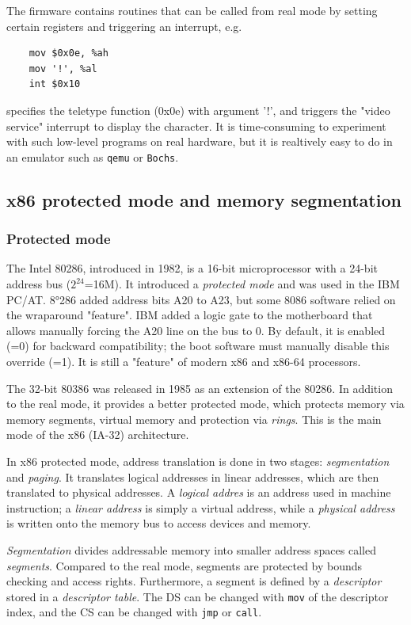 \documentclass[toc]{../cs-classes/cs-classes}
\begin{document}
The firmware contains routines that can be called from real mode by setting certain registers and triggering an interrupt, e.g.
\begin{verbatim}
    mov $0x0e, %ah
    mov '!', %al
    int $0x10
\end{verbatim}
specifies the teletype function (0x0e) with argument '!', and triggers the "video service" interrupt to display the character. It is time-consuming to experiment with such low-level programs on real hardware, but it is realtively easy to do in an emulator such as \texttt{qemu} or \texttt{Bochs}.

\subsection{x86 protected mode and memory segmentation}
\subsubsection{Protected mode}
The Intel 80286, introduced in 1982, is a 16-bit microprocessor with a 24-bit address bus ($2^{24}$=16M). It introduced a \emph{protected mode} and was used in the IBM PC/AT. 8°286 added address bits A20 to A23, but some 8086 software relied on the wraparound "feature". IBM added a logic gate to the motherboard that allows manually forcing the A20 line on the bus to 0. By default, it is enabled (=0) for backward compatibility; the boot software must manually disable this override (=1). It is still a "feature" of modern x86 and x86-64 processors.

The 32-bit 80386 was released in 1985 as an extension of the 80286. In addition to the real mode, it provides a better protected mode, which protects memory via memory segments, virtual memory and protection via \emph{rings}. This is the main mode of the x86 (IA-32) architecture.

In x86 protected mode, address translation is done in two stages: \emph{segmentation} and \emph{paging}. It translates logical addresses in linear addresses, which are then translated to physical addresses. A \emph{logical addres} is an address used in machine instruction; a \emph{linear address} is simply a virtual address, while a \emph{physical address} is written onto the memory bus to access devices and memory.

\emph{Segmentation} divides addressable memory into smaller address spaces called \emph{segments}. Compared to the real mode, segments are protected by bounds checking and access rights. Furthermore, a segment is defined by a \emph{descriptor} stored in a \emph{descriptor table}. The DS can be changed with \texttt{mov} of the descriptor index, and the CS can be changed with \texttt{jmp} or \texttt{call}.
\end{document}
